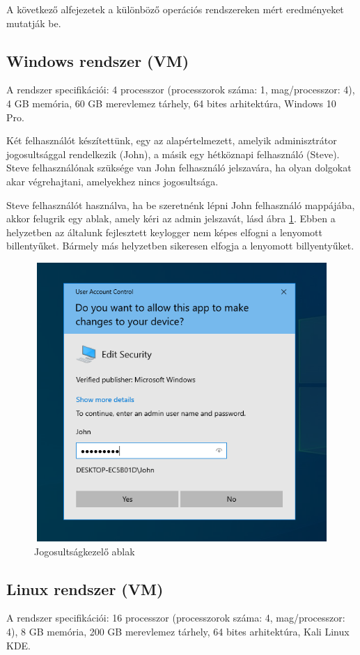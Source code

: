 \documentclass[12pt,a4paper,oneside]{report}
\begin{document}
A következő alfejezetek a különböző operációs rendszereken mért eredményeket mutatják be.

\subsection{Windows rendszer (VM)}
A rendszer specifikációi: 4 processzor (processzorok száma: 1, mag/processzor: 4), 4 GB memória, 60 GB merevlemez tárhely, 64 bites arhitektúra, Windows 10 Pro.

Két felhasználót készítettünk, egy az alapértelmezett, amelyik adminisztrátor jogosultsággal rendelkezik (John), a másik egy hétköznapi felhasználó (Steve). Steve felhasználónak szüksége van John felhasználó jelszavára, ha olyan dolgokat akar végrehajtani, amelyekhez nincs jogosultsága.

Steve felhasználót használva, ha be szeretnénk lépni John felhasználó mappájába, akkor felugrik egy ablak, amely kéri az admin jelszavát, lásd ábra \ref{fig:winVM1}. Ebben a helyzetben az  általunk fejlesztett keylogger nem képes elfogni a lenyomott billentyűket. Bármely más helyzetben sikeresen elfogja a lenyomott billyentyűket.
\begin{figure}[H]
\centering
\includegraphics[width=400pt, height=300pt]{../images/windowsVM1}
\caption{Jogosultságkezelő ablak}
\label{fig:winVM1}
\end{figure}

\subsection{Linux rendszer (VM)}
A rendszer specifikációi: 16 processzor (processzorok száma: 4, mag/processzor: 4), 8 GB memória, 200 GB merevlemez tárhely, 64 bites arhitektúra, Kali Linux KDE.
\end{document}
